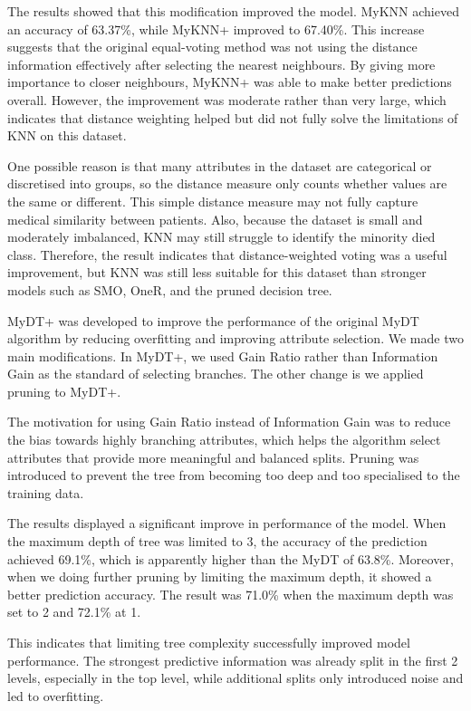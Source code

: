\documentclass[12pt,a4paper]{article}
\begin{document}
The results showed that this modification improved the model. MyKNN achieved an accuracy of 63.37\%, while MyKNN+ improved to 67.40\%. This increase suggests that the original equal-voting method was not using the distance information effectively after selecting the nearest neighbours. By giving more importance to closer neighbours, MyKNN+ was able to make better predictions overall. However, the improvement was moderate rather than very large, which indicates that distance weighting helped but did not fully solve the limitations of KNN on this dataset.

One possible reason is that many attributes in the dataset are categorical or discretised into groups, so the distance measure only counts whether values are the same or different. This simple distance measure may not fully capture medical similarity between patients. Also, because the dataset is small and moderately imbalanced, KNN may still struggle to identify the minority died class. Therefore, the result indicates that distance-weighted voting was a useful improvement, but KNN was still less suitable for this dataset than stronger models such as SMO, OneR, and the pruned decision tree.

MyDT+ was developed to improve the performance of the original MyDT algorithm by reducing overfitting and improving attribute selection. We made two main modifications. In MyDT+, we used Gain Ratio rather than Information Gain as the standard of selecting branches. The other change is we applied pruning to MyDT+.

The motivation for using Gain Ratio instead of Information Gain was to reduce the bias towards highly branching attributes, which helps the algorithm select attributes that provide more meaningful and balanced splits. Pruning was introduced to prevent the tree from becoming too deep and too specialised to the training data.

The results displayed a significant improve in performance of the model. When the maximum depth of tree was limited to 3, the accuracy of the prediction achieved 69.1\%, which is apparently higher than the MyDT of 63.8\%. Moreover, when we doing further pruning by limiting the maximum depth, it showed a better prediction accuracy. The result was 71.0\% when the maximum depth was set to 2 and 72.1\% at 1.

This indicates that limiting tree complexity successfully improved model performance. The strongest predictive information was already split in the first 2 levels, especially in the top level, while additional splits only introduced noise and led to overfitting.
\end{document}
